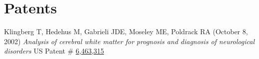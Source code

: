 \section*{Patents}
\noindent

Klingberg T, Hedehus M, Gabrieli JDE, Moseley ME, Poldrack RA (October 8, 2002) \textit{Analysis of cerebral white matter for prognosis and diagnosis of neurological disorders} US Patent \# \href{http://patft.uspto.gov/netacgi/nph-Parser?Sect1=PTO2&Sect2=HITOFF&u=%2Fnetahtml%2FPTO%2Fsearch-adv.htm&r=12&p=1&f=G&l=50&d=PTXT&S1=poldrack&OS=poldrack&RS=poldrack}{6,463,315} \vspace{2mm}

